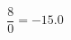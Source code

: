 \documentclass[preview]{standalone}
\begin{document}
\begin{align*}
\dfrac{ 8 }{0}= -15.0
\end{align*}
\end{document}
